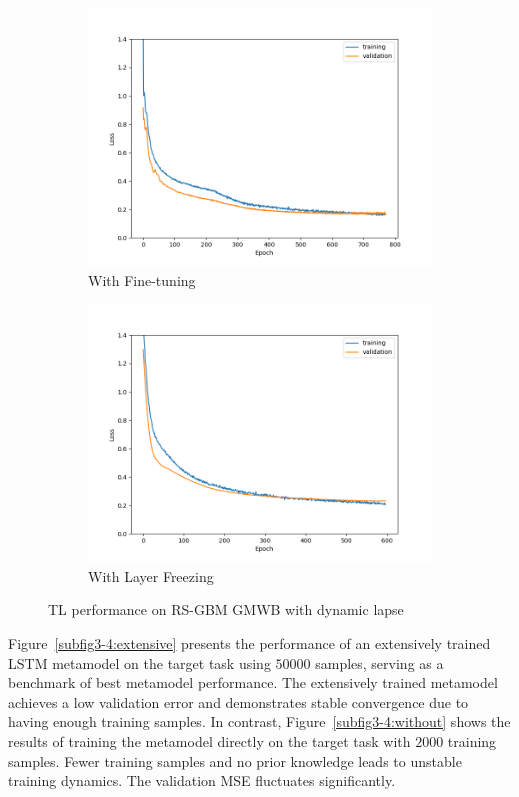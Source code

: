 \begin{figure}[ht!]
\begin{subfigure}{0.48\textwidth}
        \includegraphics[width=\textwidth]{./project3/figures/figure4c.png}
        \caption{With Fine-tuning}
        \label{subfig3-4:fineTuning}
    \end{subfigure}\hfill
    \begin{subfigure}{0.48\textwidth}
        \includegraphics[width=\textwidth]{./project3/figures/figure4d.png}
        \caption{With Layer Freezing}
        \label{subfig3-4:layerFreezing}
    \end{subfigure}
    \caption{TL performance on RS-GBM GMWB with dynamic lapse}
    \label{fig3:figure4}
\end{figure}

Figure~\ref{subfig3-4:extensive} presents the performance of an extensively trained LSTM metamodel on the target task using $\num{50000}$ samples, serving as a benchmark of best metamodel performance. 
The extensively trained metamodel achieves a low validation error and demonstrates stable convergence due to having enough training samples. 
In contrast, Figure~\ref{subfig3-4:without} shows the results of training the metamodel directly on the target task with $\num{2000}$ training samples. 
Fewer training samples and no prior knowledge leads to unstable training dynamics. 
The validation MSE fluctuates significantly.

